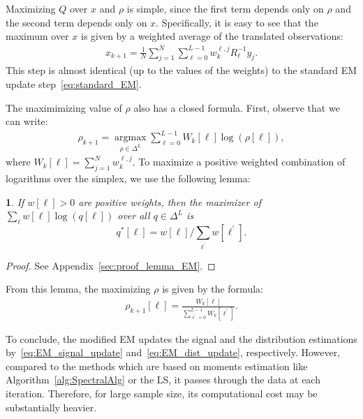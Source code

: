 \documentclass{IEEEtran}
\numberwithin{equation}{section}
\numberwithin{figure}{section}
\theoremstyle{plain}
\theoremstyle{definition}
\theoremstyle{remark}
\theoremstyle{plain}
\newtheorem{lem}[thm]{\protect\lemmaname}
\theoremstyle{remark}
\theoremstyle{plain}
\theoremstyle{plain}
\theoremstyle{remark}
\providecommand{\lemmaname}{Lemma}
\begin{document}
Maximizing $Q$ over $x$ and $\rho$ is simple, since the first term depends only on $\rho$ and the second term depends only on $x$. Specifically, it is easy to see that the maximum over $x$ is given by a weighted average of the translated observations:
%
\begin{align} \label{eq:EM_signal_update}
x_{k+1} = \frac{1}{N} \sum_{j=1}^N \sum_{\ell=0}^{L-1}  w_{k}^{\ell,j} R^{-1}_{\ell} y_j.
\end{align}
This step is almost identical (up to the values of the weights) to the standard EM update step~\eqref{eq:standard_EM}.

The maximimizing value of $\rho$ also has a closed formula. First, observe that we can write:
%
\begin{align*}
%
\rho_{k+1} = \operatorname*{arg\max}_{\rho \in \Delta^L} 
\sum_{\ell=0}^{L-1} W_k[\ell] \log (\rho[\ell]), 
%
\end{align*}
%
where $W_k[\ell] = \sum_{j=1}^N w_{k}^{\ell,j}$. To maximize a positive weighted combination of logarithms over the simplex, we use the following lemma:

\begin{lem} \label{lem:lemma_EM}
    If $w[\ell] > 0$ are positive weights, then the maximizer of $\sum_{\ell} w[\ell] \log(q[\ell])$ over all $q \in \Delta^L$ is 
    \begin{equation*}
q^*[\ell] = w[\ell] / \sum_{\ell^\prime} w[\ell^\prime].    
    \end{equation*}
    \end{lem}
%
\begin{proof}
    See Appendix~\ref{sec:proof_lemma_EM}.
\end{proof}

From this lemma, the maximizing $\rho$ is given by the formula:
%
\begin{align} \label{eq:EM_dist_update}
%
\rho_{k+1}[\ell]= \frac{W_k[\ell]} {\sum_{\ell^\prime=0}^{L-1} W_k[\ell^\prime]}.
%
\end{align}

To conclude, the modified EM updates the signal and the distribution estimations by~\eqref{eq:EM_signal_update} and~\eqref{eq:EM_dist_update}, respectively. However, compared to the methods which are based on moments estimation like Algorithm~\ref{alg:SpectralAlg} or the LS, it passes through the data at each iteration. Therefore, for large sample size, its 
computational cost may be substantially heavier.  

\end{document}
